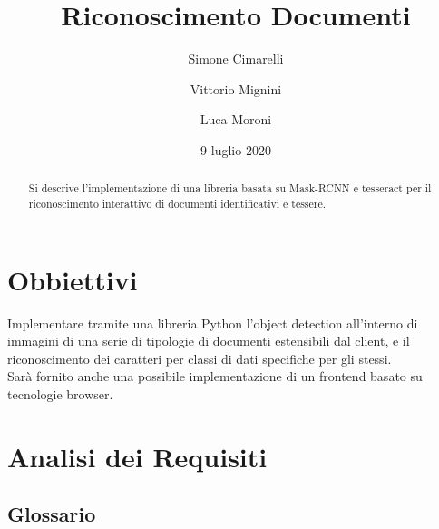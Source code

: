 \documentclass[12pt,a4paper]{article}
\begin{document}
\title{Riconoscimento Documenti}
\author{Simone Cimarelli \and Vittorio Mignini \and Luca Moroni}
\date{9 luglio 2020}

\maketitle

\begin{abstract}
    Si descrive l'implementazione di una libreria basata su Mask-RCNN e
    tesseract per il riconoscimento interattivo di documenti
    identificativi e tessere.
\end{abstract}

\section{Obbiettivi}

Implementare tramite una libreria Python l'object detection all'interno
di immagini di una serie di tipologie di documenti estensibili dal
client, e il riconoscimento dei caratteri per classi di dati specifiche
per gli stessi.\\
Sarà fornito anche una possibile implementazione di un frontend basato
su tecnologie browser.

\section{Analisi dei Requisiti}
\subsection{Glossario}
\end{document}
